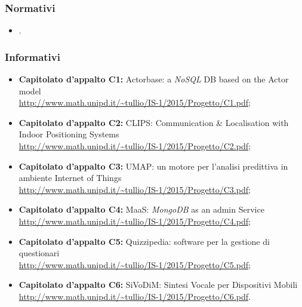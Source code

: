 \subsubsection{Normativi}
\begin{itemize}
\item \textit{\NdPv}.
\end{itemize}

\subsubsection{Informativi}
\begin{itemize}
\item \textbf{Capitolato d'appalto C1:} Actorbase: a \textit{NoSQL} DB based on the Actor model
\\\url{http://www.math.unipd.it/~tullio/IS-1/2015/Progetto/C1.pdf};
\item \textbf{Capitolato d'appalto C2:} CLIPS: Communication \& Localisation with Indoor Positioning Systems
\\\url{http://www.math.unipd.it/~tullio/IS-1/2015/Progetto/C2.pdf};
\item \textbf{Capitolato d'appalto C3:} UMAP: un motore per l'analisi predittiva in ambiente Internet of Things
\\\url{http://www.math.unipd.it/~tullio/IS-1/2015/Progetto/C3.pdf};
\item \textbf{Capitolato d'appalto C4:} MaaS: \textit{MongoDB} as an admin Service
\\\url{http://www.math.unipd.it/~tullio/IS-1/2015/Progetto/C4.pdf};
\item \textbf{Capitolato d'appalto C5:} Quizzipedia: software per la gestione di questionari
\\\url{http://www.math.unipd.it/~tullio/IS-1/2015/Progetto/C5.pdf};
\item \textbf{Capitolato d'appalto C6:} SiVoDiM: Sintesi Vocale per Dispositivi Mobili
\\\url{http://www.math.unipd.it/~tullio/IS-1/2015/Progetto/C6.pdf}.
\end{itemize}
